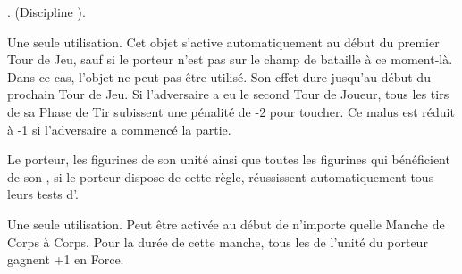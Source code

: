 . \wildernessone{} (Discipline \wilderness{}).

Une seule utilisation. Cet objet s'active automatiquement au début du premier Tour de Jeu, sauf si le porteur n'est pas sur le champ de bataille à ce moment-là. Dans ce cas, l'objet ne peut pas être utilisé. Son effet dure jusqu'au début du prochain Tour de Jeu. Si l'adversaire a eu le second Tour de Joueur, tous les tirs de sa Phase de Tir subissent une pénalité de -2 pour toucher. Ce malus est réduit à -1 si l'adversaire a commencé la partie.

Le porteur, les figurines de son unité ainsi que toutes les figurines qui bénéficient de son \inspiringpresence{}, si le porteur dispose de cette règle, réussissent automatiquement tous leurs tests d'\primalinstinct{}.

\endpricelist

\armymagicalbanners

\startpricelist

Une seule utilisation. Peut être activée au début de n'importe quelle Manche de Corps à Corps. Pour la durée de cette manche, tous les \wildhorns{} de l'unité du porteur gagnent +1 en Force.

\endpricelist

\closearmymagicalitems














\quickrefsheettitle

